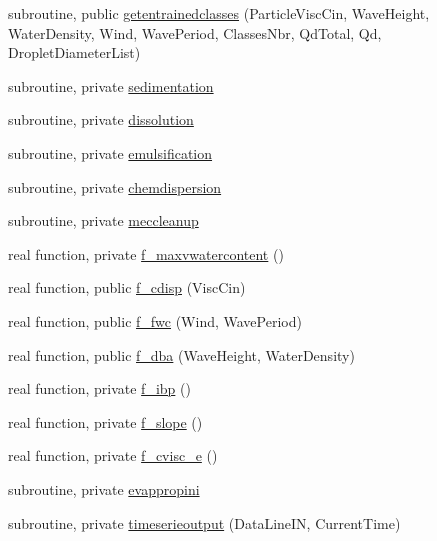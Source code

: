 \begin{DoxyCompactItemize}
\item 
subroutine, public \mbox{\hyperlink{namespacemoduleoil__0d_a3dc497493c2537b1f55d043f488bcb36}{getentrainedclasses}} (Particle\+Visc\+Cin, Wave\+Height, Water\+Density, Wind, Wave\+Period, Classes\+Nbr, Qd\+Total, Qd, Droplet\+Diameter\+List)
\item 
subroutine, private \mbox{\hyperlink{namespacemoduleoil__0d_a45b30490a7ce5da933ae0f54cfea07d9}{sedimentation}}
\item 
subroutine, private \mbox{\hyperlink{namespacemoduleoil__0d_a5b8886545b16a4515a2adcc5ae3f6573}{dissolution}}
\item 
subroutine, private \mbox{\hyperlink{namespacemoduleoil__0d_acae01578d384bd637cbfb5b788022edc}{emulsification}}
\item 
subroutine, private \mbox{\hyperlink{namespacemoduleoil__0d_a0572ecc4d1cd6504abb835636eeb8f26}{chemdispersion}}
\item 
subroutine, private \mbox{\hyperlink{namespacemoduleoil__0d_a44f803669a7c3e8a5a116008eb987343}{meccleanup}}
\item 
real function, private \mbox{\hyperlink{namespacemoduleoil__0d_acf1e57739fa15b9c76feeec263af3ff1}{f\+\_\+maxvwatercontent}} ()
\item 
real function, public \mbox{\hyperlink{namespacemoduleoil__0d_aec999ef14a345781bcc8300cd1c2999f}{f\+\_\+cdisp}} (Visc\+Cin)
\item 
real function, public \mbox{\hyperlink{namespacemoduleoil__0d_a61a73c3b473d2b0773d7812c5c93cea0}{f\+\_\+fwc}} (Wind, Wave\+Period)
\item 
real function, public \mbox{\hyperlink{namespacemoduleoil__0d_a4505ef2294ae0f155df322a4eac4bf20}{f\+\_\+dba}} (Wave\+Height, Water\+Density)
\item 
real function, private \mbox{\hyperlink{namespacemoduleoil__0d_ab82b97aa427e0d7e1bbc78682343551e}{f\+\_\+ibp}} ()
\item 
real function, private \mbox{\hyperlink{namespacemoduleoil__0d_ae99633ccabb196155d1a32fafef217b3}{f\+\_\+slope}} ()
\item 
real function, private \mbox{\hyperlink{namespacemoduleoil__0d_aa41484e186e3a6c29ae4d6e5b3bbdc1e}{f\+\_\+cvisc\+\_\+e}} ()
\item 
subroutine, private \mbox{\hyperlink{namespacemoduleoil__0d_ae29b450b668a71108a4246a29ec789eb}{evappropini}}
\item 
subroutine, private \mbox{\hyperlink{namespacemoduleoil__0d_adc57618d972ed75f50dada4e81e80be6}{timeserieoutput}} (Data\+Line\+IN, Current\+Time)

\end{DoxyCompactItemize}

